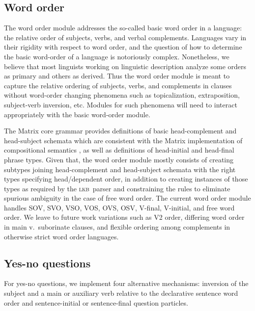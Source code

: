 \documentclass[11pt]{article}
\newcommand{\hpsg}{\textsc{hpsg}}
\newcommand{\lkb}{\textsc{lkb}}
\begin{document}
\subsection{Word order}

The word order module addresses the so-called basic word order in a
language: the relative order of subjects, verbs, and verbal
complements.  Languages vary in their rigidity with respect to word
order, and the question of how to determine the basic word-order of a
language is notoriously complex.  Nonetheless, we believe that most
linguists working on linguistic description analyze some orders
as primary and others as derived.  Thus the word order module is
meant to capture the relative ordering
of subjects, verbs, and complements in clauses without
word-order changing phenomena such as topicalization,
extraposition, subject-verb inversion, etc.
Modules for such phenomena will need to interact
appropriately with the basic word-order module.

The Matrix core grammar provides definitions of basic head-complement
and head-subject schemata which are consistent with the Matrix
implementation of compositional semantics \cite{Fli:Ben:03}, as well
as definitions of head-initial and head-final phrase types.  
Given that, the word order module
mostly consists of creating subtypes joining head-complement and
head-subject schemata with the right types specifying head/dependent
order, in addition to creating instances of those types as required by
the \lkb\ parser and constraining the rules to eliminate spurious ambiguity in the case of
free word order.  The current word order module handles SOV, SVO,
VSO, VOS, OVS, OSV, V-final, V-initial, and free word order.  We leave
to future work variations such as V2 order, differing word order
in main v.\ suborinate clauses, 
and flexible ordering among
complements in otherwise strict word order languages.  

\subsection{Yes-no questions}

For yes-no questions, we implement four alternative mechanisms:
inversion of the subject and a main or auxiliary verb relative
to the declarative sentence word order and sentence-initial
or sentence-final question particles.
\end{document}
